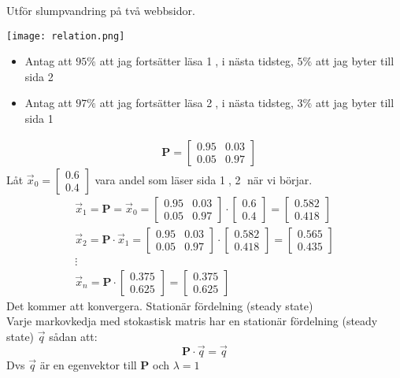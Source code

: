 \begin{Ex}
	Utför slumpvandring på två webbsidor.
	\begin{center}
		\texttt{[image: relation.png]}
	\end{center}
	\begin{itemize}
		\item Antag att $95\%$ att jag fortsätter läsa \textcircled{1}, i nästa tidsteg, $5\%$ att jag byter till sida \textcircled{2}
		\item Antag att $97\%$ att jag fortsätter läsa \textcircled{2}, i nästa tidsteg, $3\%$ att jag byter till sida \textcircled{1}
	\end{itemize}
	\begin{align*}
	&\mathbf{P} = 
	\begin{bmatrix}
		0.95 & 0.03\\
		0.05 & 0.97
	\end{bmatrix}
	\end{align*}
	Låt $\vec{x}_0 = \begin{bmatrix} 0.6\\0.4 \end{bmatrix}$ vara andel som läser sida \textcircled{1}, \textcircled{2} när vi börjar.
	\begin{gather*}
		\vec{x}_1 = \mathbf{P} = \vec{x}_0 = 
		\begin{bmatrix}
			0.95 & 0.03\\
			0.05 & 0.97
		\end{bmatrix} \cdot
		\begin{bmatrix} 0.6\\0.4 \end{bmatrix} = 
		\begin{bmatrix} 0.582\\0.418 \end{bmatrix} \\
		\vec{x}_2 = \mathbf{P} \cdot \vec{x}_1 = 
		\begin{bmatrix}
			0.95 & 0.03\\
			0.05 & 0.97
		\end{bmatrix} \cdot 
		\begin{bmatrix} 0.582\\0.418 \end{bmatrix} = 
		\begin{bmatrix} 0.565\\0.435 \end{bmatrix}\\
		\vdots \\
		\vec{x}_n = \mathbf{P} \cdot
		\begin{bmatrix}
			0.375\\
			0.625
		\end{bmatrix} = 
		\begin{bmatrix}
			0.375\\
			0.625
		\end{bmatrix}
	\end{gather*}
	Det kommer att konvergera. Stationär fördelning (steady state)\\
	Varje markovkedja med stokastisk matris har en stationär fördelning (steady state) $\vec{q}$ sådan att:
	\[
	\mathbf{P} \cdot \vec{q} = \vec{q}
	\]
	Dvs $\vec{q}$ är en egenvektor till \textbf{P} och $\lambda = 1$
\end{Ex}
